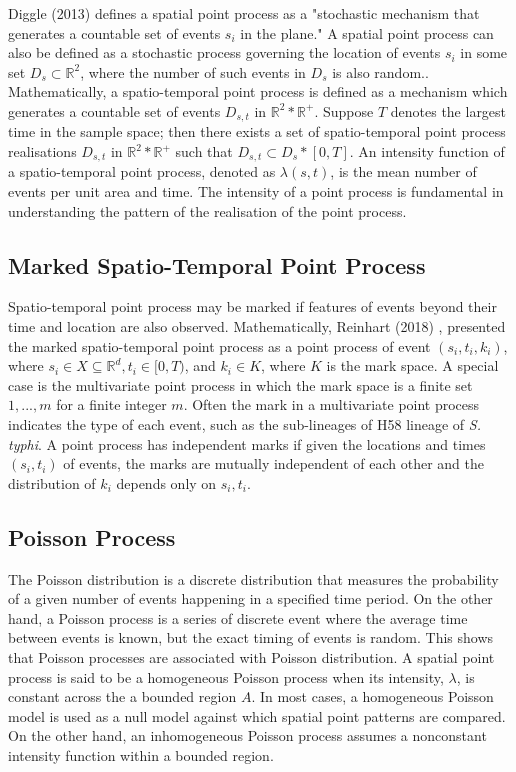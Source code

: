 \documentclass[12pt,a4paper]{report}
\begin{document}
Diggle (2013) defines a spatial point process as a "stochastic mechanism that generates a countable
set of events $s_i$
in the plane."\cite{Diggle2013} A spatial point process can also be defined as a stochastic process governing the location of events ${s_i}$ in some set $D_s \subset \mathbb{R}^2$, where the number of such events in $D_s$ is also random.\cite{CressieWikle2011}. Mathematically, a spatio-temporal point process is defined as a mechanism which generates a countable set of events $D_{s,t}$ in  $\mathbb{R}^2 * \mathbb{R^+}$. Suppose $T$ denotes the largest time in the sample space; then there exists a set of spatio-temporal point process realisations $D_{s,t}$ in  $\mathbb{R}^2 * \mathbb{R^+}$ such that $D_{s,t} \subset D_s * [0,T]$.\cite{CressieWikle2011} An intensity function of a spatio-temporal point process, denoted as $\lambda (s,t)$, is the mean number of events per unit area and time. The intensity of a point process is fundamental in understanding the pattern of the realisation of the point process.

\subsection{Marked Spatio-Temporal Point Process} \label{2.3.3}

Spatio-temporal point process may be marked if features of events beyond their time and location are also observed. Mathematically, Reinhart (2018) \cite{Reinhart2018}, presented the marked spatio-temporal point process  as a point process of event ${(s_i,t_i,k_i)}$, where $s_i \in X \subseteq \mathbb{R}^d, t_i \in [0,T)$, and $k_i \in K$, where $K$ is the mark space. A special case is the multivariate point process in which the mark space is a finite set ${1,...,m}$ for a finite integer $m$. Often the mark in a multivariate point process indicates the type of each event, such as the sub-lineages of H58 lineage of \textit{S. typhi}. A point process has independent marks if given the locations and times ${(s_i,t_i)}$ of events, the marks are mutually independent of each other and the distribution of $k_i$ depends only on ${s_i,t_i}$.\cite{Reinhart2018}

\subsection{Poisson Process}

The Poisson distribution is a discrete distribution that measures the probability of a given number of events happening in a specified time period. On the other hand, a Poisson process is a series of discrete event where the average time between events is known, but the exact timing of events is random. This shows that Poisson processes are associated with Poisson distribution. A spatial point process is said to be a homogeneous Poisson process when its intensity, $\lambda$, is constant across the a bounded region $A$. In most cases, a homogeneous Poisson model is used as a null model against which spatial point patterns are compared. On the other hand, an inhomogeneous Poisson process assumes a nonconstant intensity function within a bounded region.
\end{document}
